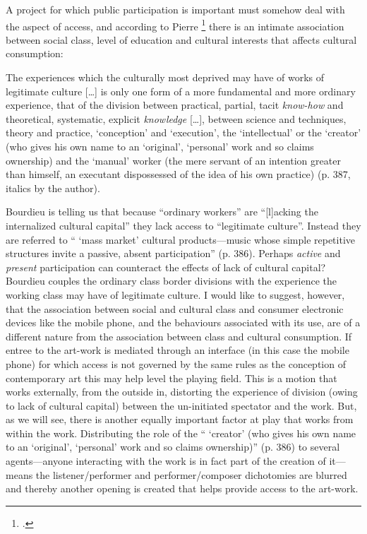 A project for which public participation is important must somehow deal with the aspect of access, and according to Pierre \footcite{bourdieu} there is an intimate association between social class, level of education and cultural interests that affects cultural consumption:
\begin{squote}
The experiences which the culturally most deprived may have of works of legitimate culture [\ldots] is only one form of a more fundamental and more ordinary experience, that of the division between practical, partial, tacit \textit{know-how} and theoretical, systematic, explicit \textit{knowledge} [\ldots], between science and techniques, theory and practice, `conception' and `execution', the `intellectual' or the `creator' (who gives his own name to an `original', `personal' work and so claims ownership) and the `manual' worker (the mere servant of an intention greater than himself, an executant dispossessed of the idea of his own practice) (p. 387, italics by the author). 
\end{squote}
Bourdieu is telling us that because ``ordinary workers'' are ``[l]acking the internalized cultural capital'' they lack access to ``legitimate culture''. Instead they are referred to `` `mass market' cultural products---music whose simple repetitive structures invite a passive, absent participation'' (p. 386). Perhaps \emph{active} and \emph{present} participation can counteract the effects of lack of cultural capital? Bourdieu couples the ordinary class border divisions with the experience the working class may have of legitimate culture. I would like to suggest, however, that the association between social and cultural class and consumer electronic devices like the mobile phone, and the behaviours associated with its use, are of a different nature from the association between class and cultural consumption. If entree to the art-work is mediated through an interface (in this case the mobile phone) for which access is not governed by the same rules as the conception of contemporary art this may help level the playing field. 
This is a motion that works externally, from the outside in, distorting the experience of division (owing to lack of cultural capital) between the un-initiated spectator and the work. But, as we will see, there is another equally important factor at play that works from within the work. Distributing the role of the `` `creator' (who gives his own name to an `original', `personal' work and so claims ownership)'' (p. 386) to several agents---anyone interacting with the work is in fact part of the creation of it---means the listener/performer and performer/composer dichotomies are blurred and thereby another opening is created that helps provide access to the art-work. 

